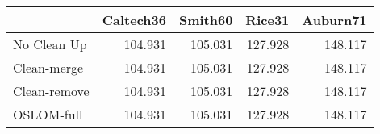 \begin{tabular}{lrrrr}
\toprule
{} & Caltech36 & Smith60 &  Rice31 & Auburn71 \\
\midrule
No Clean Up  &   104.931 & 105.031 & 127.928 &  148.117 \\
Clean-merge  &   104.931 & 105.031 & 127.928 &  148.117 \\
Clean-remove &   104.931 & 105.031 & 127.928 &  148.117 \\
OSLOM-full   &   104.931 & 105.031 & 127.928 &  148.117 \\
\bottomrule
\end{tabular}
